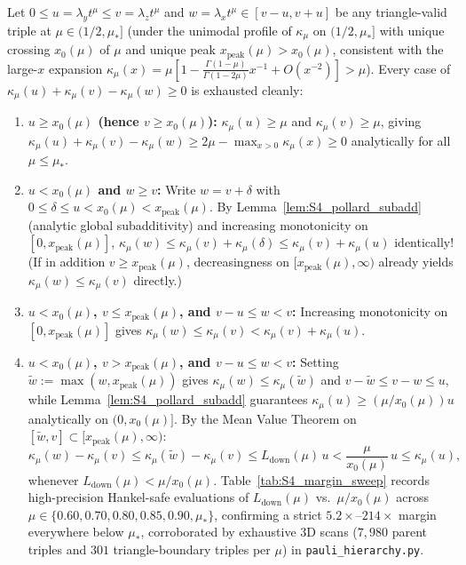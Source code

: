 \documentclass[onecolumn,10pt,notitlepage,amsmath,amssymb,floatfix]{revtex4-2}
\theoremstyle{plain}
\theoremstyle{definition}
\newcommand{\mustar}{\mu_*}
\begin{document}
Let $0 \le u = \lambda_y t^\mu \le v = \lambda_z t^\mu$ and $w = \lambda_x t^\mu \in [v-u, v+u]$ be any triangle-valid triple at $\mu \in (1/2, \mustar]$ (under the unimodal profile of $\kappa_\mu$ on $(1/2, \mustar]$ with unique crossing $x_0(\mu)$ of $\mu$ and unique peak $x_{\mathrm{peak}}(\mu) > x_0(\mu)$, consistent with the large-$x$ expansion $\kappa_\mu(x) = \mu[1 - \frac{\Gamma(1-\mu)}{\Gamma(1-2\mu)}x^{-1} + O(x^{-2})] > \mu$). Every case of $\kappa_\mu(u) + \kappa_\mu(v) - \kappa_\mu(w) \ge 0$ is exhausted cleanly:
\begin{enumerate}[label=(\roman*),leftmargin=1.8em,itemsep=1pt]
\item \textbf{$u \ge x_0(\mu)$ (hence $v \ge x_0(\mu)$):} $\kappa_\mu(u) \ge \mu$ and $\kappa_\mu(v) \ge \mu$, giving $\kappa_\mu(u) + \kappa_\mu(v) - \kappa_\mu(w) \ge 2\mu - \max_{x>0}\kappa_\mu(x) \ge 0$ analytically for all $\mu \le \mustar$.
\item \textbf{$u < x_0(\mu)$ and $w \ge v$:} Write $w = v + \delta$ with $0 \le \delta \le u < x_0(\mu) < x_{\mathrm{peak}}(\mu)$. By Lemma~\ref{lem:S4_pollard_subadd} (analytic global subadditivity) and increasing monotonicity on $[0, x_{\mathrm{peak}}(\mu)]$, $\kappa_\mu(w) \le \kappa_\mu(v) + \kappa_\mu(\delta) \le \kappa_\mu(v) + \kappa_\mu(u)$ identically! (If in addition $v \ge x_{\mathrm{peak}}(\mu)$, decreasingness on $[x_{\mathrm{peak}}(\mu), \infty)$ already yields $\kappa_\mu(w) \le \kappa_\mu(v)$ directly.)
\item \textbf{$u < x_0(\mu)$, $v \le x_{\mathrm{peak}}(\mu)$, and $v - u \le w < v$:} Increasing monotonicity on $[0, x_{\mathrm{peak}}(\mu)]$ gives $\kappa_\mu(w) \le \kappa_\mu(v) < \kappa_\mu(v) + \kappa_\mu(u)$.
\item \textbf{$u < x_0(\mu)$, $v > x_{\mathrm{peak}}(\mu)$, and $v - u \le w < v$:} Setting $\tilde{w} := \max(w, x_{\mathrm{peak}}(\mu))$ gives $\kappa_\mu(w) \le \kappa_\mu(\tilde{w})$ and $v - \tilde{w} \le v - w \le u$, while Lemma~\ref{lem:S4_pollard_subadd} guarantees $\kappa_\mu(u) \ge (\mu/x_0(\mu))u$ analytically on $(0, x_0(\mu)]$. By the Mean Value Theorem on $[\tilde{w}, v] \subset [x_{\mathrm{peak}}(\mu), \infty)$:
\[
\kappa_\mu(w) - \kappa_\mu(v)
\le \kappa_\mu(\tilde{w}) - \kappa_\mu(v)
\le L_{\mathrm{down}}(\mu)\,u
< \frac{\mu}{x_0(\mu)}\,u
\le \kappa_\mu(u),
\]
whenever $L_{\mathrm{down}}(\mu) < \mu/x_0(\mu)$. Table~\ref{tab:S4_margin_sweep} records high-precision Hankel-safe evaluations of $L_{\mathrm{down}}(\mu)$ vs.\ $\mu/x_0(\mu)$ across $\mu \in \{0.60, 0.70, 0.80, 0.85, 0.90, \mustar\}$, confirming a strict $5.2\times$--$214\times$ margin everywhere below $\mustar$, corroborated by exhaustive 3D scans ($7{,}980$ parent triples and $301$ triangle-boundary triples per $\mu$) in \texttt{pauli\_hierarchy.py}.
\end{enumerate}
\end{document}
